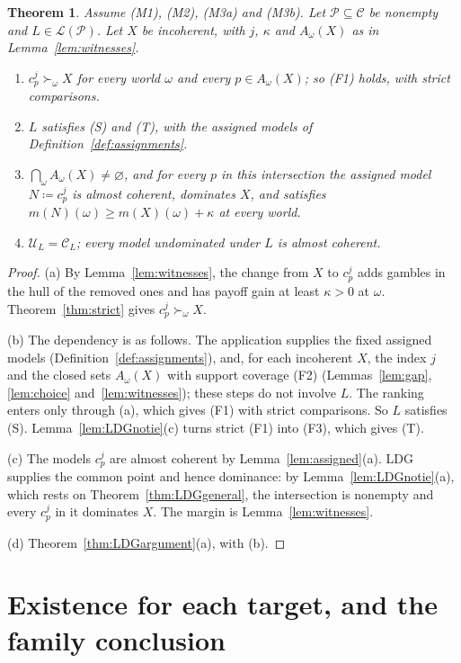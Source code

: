 \documentclass[11pt]{article}
\newtheorem{theorem}{Theorem}[section]
\theoremstyle{definition}
\newcommand{\C}{\mathcal C}
\newcommand{\U}{\mathcal U}
\newcommand{\Lc}{\mathcal L}
\newcommand{\Pc}{\mathcal P}
\begin{document}
\begingroup\color{red}
\begin{theorem}\label{thm:selection}
Assume (M1), (M2), (M3a) and (M3b). Let $\Pc\subseteq\C$ be nonempty and $L\in\Lc(\Pc)$. Let $X$ be incoherent, with $j$, $\kappa$ and $A_\omega(X)$ as in Lemma~\ref{lem:witnesses}.
\begin{enumerate}[label=(\alph*)]
\item $c^j_p\succ_\omega X$ for every world $\omega$ and every $p\in A_\omega(X)$; so (F1) holds, with strict comparisons.
\item $L$ satisfies (S) and (T), with the assigned models of Definition~\ref{def:assignments}.
\item $\bigcap_\omega A_\omega(X)\ne\varnothing$, and for every $p$ in this intersection the assigned model $N\coloneqq c^j_p$ is almost coherent, dominates $X$, and satisfies $m(N)(\omega)\ge m(X)(\omega)+\kappa$ at every world.
\item $\U_L=\C_L$; every model undominated under $L$ is almost coherent.
\end{enumerate}
\end{theorem}
\begin{proof}
(a) By Lemma~\ref{lem:witnesses}, the change from $X$ to $c^j_p$ adds gambles in the hull of the removed ones and has payoff gain at least $\kappa>0$ at $\omega$. Theorem~\ref{thm:strict} gives $c^j_p\succ_\omega X$.

(b) The dependency is as follows. The application supplies the fixed assigned models (Definition~\ref{def:assignments}), and, for each incoherent $X$, the index $j$ and the closed sets $A_\omega(X)$ with support coverage (F2) (Lemmas~\ref{lem:gap}, \ref{lem:choice} and~\ref{lem:witnesses}); these steps do not involve $L$. The ranking enters only through (a), which gives (F1) with strict comparisons. So $L$ satisfies (S). Lemma~\ref{lem:LDGnotie}(c) turns strict (F1) into (F3), which gives (T).

(c) The models $c^j_p$ are almost coherent by Lemma~\ref{lem:assigned}(a). LDG supplies the common point and hence dominance: by Lemma~\ref{lem:LDGnotie}(a), which rests on Theorem~\ref{thm:LDGgeneral}, the intersection is nonempty and every $c^j_p$ in it dominates $X$. The margin is Lemma~\ref{lem:witnesses}.

(d) Theorem~\ref{thm:LDGargument}(a), with (b).
\end{proof}
\endgroup

\begingroup\color{red}
\section{Existence for each target, and the family conclusion}\label{sec:existence}
\end{document}
